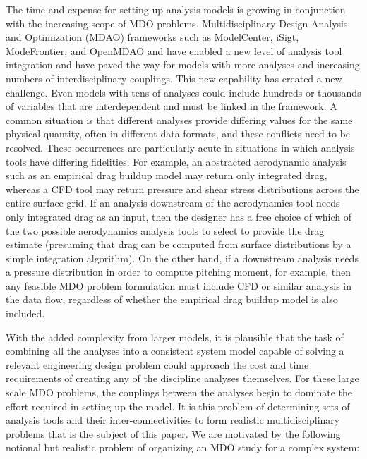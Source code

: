    The time and expense for setting up 
    analysis models is growing in conjunction with the increasing scope of MDO problems. 
    Multidisciplinary Design Analysis and Optimization (MDAO)
    frameworks such as {ModelCenter}\textregistered, iSigt\textregistered, ModeFrontier\textregistered, and OpenMDAO \cite{Gray2012}and have enabled a new level of analysis tool integration 
    and have paved the way for models with more analyses and increasing numbers of interdisciplinary couplings. This 
    new capability has created a new challenge. Even models with tens of analyses could include hundreds or thousands
    of variables that are interdependent and must be linked in the framework. 
    A common situation is that different analyses provide differing values for the 
    same physical quantity, often in different data formats, and these conflicts need to be resolved. 
    These occurrences are particularly acute in situations in which analysis tools have differing fidelities. For
    example, an abstracted aerodynamic analysis such as an empirical drag buildup model may return only
    integrated drag, whereas a CFD tool may return pressure and shear stress distributions across the entire
    surface grid. If an analysis downstream of the aerodynamics tool needs only integrated drag as an input,
    then the designer has a free choice of which of the two possible aerodynamics analysis tools to select to
    provide the drag estimate (presuming that drag can be computed from surface distributions by a simple
    integration algorithm). On the other hand, if a downstream analysis needs a pressure distribution in
    order to compute pitching moment, for example, then any feasible MDO problem formulation must
    include CFD or similar analysis in the data flow, regardless of whether the empirical drag buildup model
    is also included.

    With the added complexity from larger models, it is plausible that the task of combining all the analyses into a 
    consistent system model capable of solving a relevant engineering design 
    problem could approach the cost and time requirements of creating any of the discipline 
    analyses themselves. For these large scale MDO problems, the couplings between the 
    analyses begin to dominate the effort required in setting up the model. It is this problem of 
    determining sets of analysis tools and their inter-connectivities to form realistic
    multidisciplinary problems that is the subject of this paper. We are motivated by the following notional
    but realistic problem of organizing an MDO study for a complex system:

